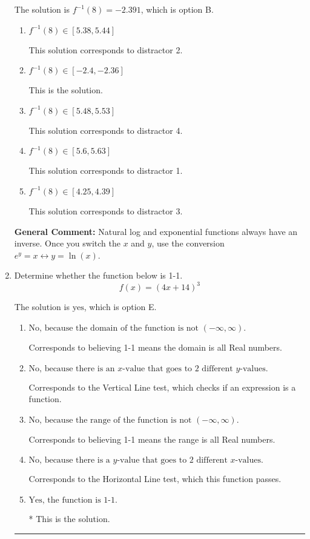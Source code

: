 \documentclass{extbook}[14pt]
\newcommand{\litem}[1]{\item #1

\rule{\textwidth}{0.4pt}}
\begin{document}
\begin{enumerate}
{The solution is \( f^{-1}(8) = -2.391 \), which is option B.\begin{enumerate}[label=\Alph*.]
\item \( f^{-1}(8) \in [5.38, 5.44] \)

 This solution corresponds to distractor 2.
\item \( f^{-1}(8) \in [-2.4, -2.36] \)

 This is the solution.
\item \( f^{-1}(8) \in [5.48, 5.53] \)

 This solution corresponds to distractor 4.
\item \( f^{-1}(8) \in [5.6, 5.63] \)

 This solution corresponds to distractor 1.
\item \( f^{-1}(8) \in [4.25, 4.39] \)

 This solution corresponds to distractor 3.
\end{enumerate}

\textbf{General Comment:} Natural log and exponential functions always have an inverse. Once you switch the $x$ and $y$, use the conversion $ e^y = x \leftrightarrow y=\ln(x)$.
}
\litem{
Determine whether the function below is 1-1.
\[ f(x) = (4 x + 14)^3 \]

The solution is \( \text{yes} \), which is option E.\begin{enumerate}[label=\Alph*.]
\item \( \text{No, because the domain of the function is not $(-\infty, \infty)$.} \)

Corresponds to believing 1-1 means the domain is all Real numbers.
\item \( \text{No, because there is an $x$-value that goes to 2 different $y$-values.} \)

Corresponds to the Vertical Line test, which checks if an expression is a function.
\item \( \text{No, because the range of the function is not $(-\infty, \infty)$.} \)

Corresponds to believing 1-1 means the range is all Real numbers.
\item \( \text{No, because there is a $y$-value that goes to 2 different $x$-values.} \)

Corresponds to the Horizontal Line test, which this function passes.
\item \( \text{Yes, the function is 1-1.} \)

* This is the solution.
\end{enumerate}

}
\end{enumerate}
\end{document}
